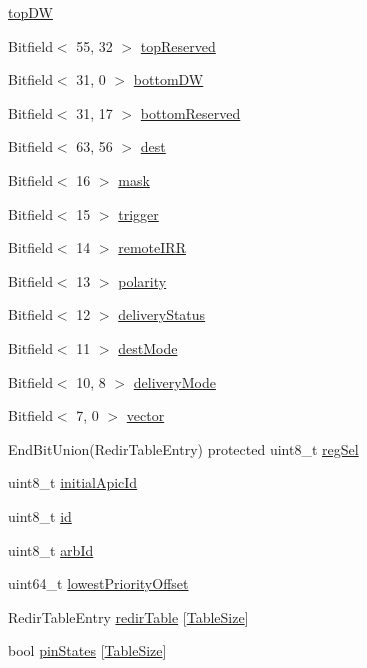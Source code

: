 \begin{DoxyCompactItemize}
\item 
\hyperlink{classX86ISA_1_1I82094AA_a111bfdfbf9000eeefa76026350b2597f}{topDW}
\item 
Bitfield$<$ 55, 32 $>$ \hyperlink{classX86ISA_1_1I82094AA_a91847c8f9fbbd5be70da8e6af01b26bb}{topReserved}
\item 
Bitfield$<$ 31, 0 $>$ \hyperlink{classX86ISA_1_1I82094AA_a09039405e8bb064cfab41786a5a3038b}{bottomDW}
\item 
Bitfield$<$ 31, 17 $>$ \hyperlink{classX86ISA_1_1I82094AA_aa5d6a929978df9b06c2a7d4c50ce385d}{bottomReserved}
\item 
Bitfield$<$ 63, 56 $>$ \hyperlink{classX86ISA_1_1I82094AA_aeaa7168c2c22fe679ac5f9a4a1fb0390}{dest}
\item 
Bitfield$<$ 16 $>$ \hyperlink{classX86ISA_1_1I82094AA_aabfd857e75bf142be3b1bd1db6d81583}{mask}
\item 
Bitfield$<$ 15 $>$ \hyperlink{classX86ISA_1_1I82094AA_a1a8acf21e383afeb477a3d8e88b689de}{trigger}
\item 
Bitfield$<$ 14 $>$ \hyperlink{classX86ISA_1_1I82094AA_ae074e6e7f5c02b863d4ffe1040e7e7a0}{remoteIRR}
\item 
Bitfield$<$ 13 $>$ \hyperlink{classX86ISA_1_1I82094AA_ae3c9a79ca2272b1906da22919f226af3}{polarity}
\item 
Bitfield$<$ 12 $>$ \hyperlink{classX86ISA_1_1I82094AA_abe55336004f210f2b2c0421f55ea7c3e}{deliveryStatus}
\item 
Bitfield$<$ 11 $>$ \hyperlink{classX86ISA_1_1I82094AA_ae6a8d79068dd7c14202c5384ab9076ae}{destMode}
\item 
Bitfield$<$ 10, 8 $>$ \hyperlink{classX86ISA_1_1I82094AA_aa6bdaa7818eb499f0dcf848f4ae7d569}{deliveryMode}
\item 
Bitfield$<$ 7, 0 $>$ \hyperlink{classX86ISA_1_1I82094AA_a8b9597b04839779d67912b193653be20}{vector}
\item 
EndBitUnion(RedirTableEntry) protected uint8\_\-t \hyperlink{classX86ISA_1_1I82094AA_aa40a207fb274f62046d99924bd138280}{regSel}
\item 
uint8\_\-t \hyperlink{classX86ISA_1_1I82094AA_a106ad81ca27007fff38acbd0a0b61d8e}{initialApicId}
\item 
uint8\_\-t \hyperlink{classX86ISA_1_1I82094AA_a1e6927fa1486224044e568f9c370519b}{id}
\item 
uint8\_\-t \hyperlink{classX86ISA_1_1I82094AA_a6a6f6c02dd2e4ed286c88b2809e36146}{arbId}
\item 
uint64\_\-t \hyperlink{classX86ISA_1_1I82094AA_a0e3677dd1ad49cc615abbee3bc94af3f}{lowestPriorityOffset}
\item 
RedirTableEntry \hyperlink{classX86ISA_1_1I82094AA_acad7eb01e83e49ac5388cd6fddd75f89}{redirTable} \mbox{[}\hyperlink{classX86ISA_1_1I82094AA_a7556b7f499a21a1415a7ed642e8a9f9b}{TableSize}\mbox{]}
\item 
bool \hyperlink{classX86ISA_1_1I82094AA_af77117f04721948e9078ef45189b6bb6}{pinStates} \mbox{[}\hyperlink{classX86ISA_1_1I82094AA_a7556b7f499a21a1415a7ed642e8a9f9b}{TableSize}\mbox{]}
\end{DoxyCompactItemize}
